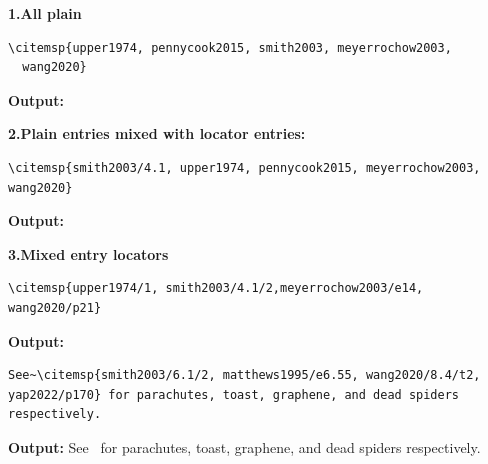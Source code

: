 \documentclass[11pt, a4paper]{article}
\begin{document}
\medskip
\noindent\textbf{1.\enspace All plain}

\begin{tcolorbox}[colback=blue!3, colframe=blue!30, boxrule=0.5pt, arc=2pt, top=6pt, bottom=6pt, left=10pt, right=10pt]
\begin{verbatim}
\citemsp{upper1974, pennycook2015, smith2003, meyerrochow2003,
  wang2020}
\end{verbatim}
\end{tcolorbox}

\noindent\textbf{Output:}

\medskip
\noindent\textbf{2.\enspace Plain entries mixed with locator entries:}

\begin{tcolorbox}[colback=blue!3, colframe=blue!30, boxrule=0.5pt, arc=2pt, top=6pt, bottom=6pt, left=10pt, right=10pt]
\begin{verbatim}
\citemsp{smith2003/4.1, upper1974, pennycook2015, meyerrochow2003, wang2020}
\end{verbatim}
\end{tcolorbox}

\noindent\textbf{Output:}

\medskip
\noindent\textbf{3.\enspace Mixed entry locators}

\begin{tcolorbox}[colback=blue!3, colframe=blue!30, boxrule=0.5pt, arc=2pt, top=6pt, bottom=6pt, left=10pt, right=10pt]
\begin{verbatim}
\citemsp{upper1974/1, smith2003/4.1/2,meyerrochow2003/e14, wang2020/p21}
\end{verbatim}
\end{tcolorbox}

\noindent\textbf{Output:}

\begin{tcolorbox}[colback=blue!3, colframe=blue!30, boxrule=0.5pt, arc=2pt, top=6pt, bottom=6pt, left=10pt, right=10pt]
\begin{verbatim}
See~\citemsp{smith2003/6.1/2, matthews1995/e6.55, wang2020/8.4/t2, 
yap2022/p170} for parachutes, toast, graphene, and dead spiders respectively.
\end{verbatim}
\end{tcolorbox}

\noindent\textbf{Output:}
See~ for parachutes, toast, graphene, and dead spiders
respectively.
\end{document}
